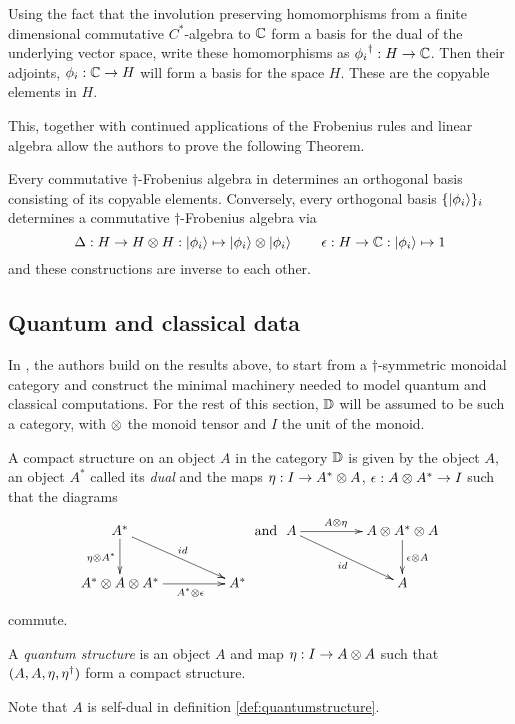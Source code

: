 Using the fact that the involution preserving homomorphisms from a finite dimensional commutative
$C^{*}$-algebra to $\mathbb{C}$ form a basis for the dual of the underlying vector space, write these
homomorphisms as ${\phi_{i}}^{\dagger}:H \to \mathbb{C}$. Then their adjoints, $\phi_{i}:\mathbb{C}\to H$ will form a
basis for the space $H$. These are the copyable elements in $H$.

This, together with continued applications of the Frobenius rules and linear algebra allow the
authors to prove the following Theorem.
\begin{theorem}
  Every commutative $\dagger$-Frobenius algebra in \fdh determines an orthogonal basis consisting
  of its copyable elements. Conversely, every orthogonal basis $\{\left\vert{\phi_{i}}\right\rangle\}_{i}$ determines
  a commutative $\dagger$-Frobenius algebra via \[\Delta:H\to H\otimes H: \left\vert{\phi_{i}}\right\rangle\mapsto
  \left\vert{\phi_{i}}\right\rangle \otimes \left\vert{\phi_{i}}\right\rangle\qquad\epsilon : H\to \mathbb{C} : \left\vert{\phi_{i}}\right\rangle \mapsto 1\] and these
  constructions are inverse to each other.
\end{theorem}

\subsection{Quantum and classical data}\label{sec:quantumclassical}
In \cite{coecke08structures}, the authors build on the results above,
to start from a $\dagger$-symmetric monoidal category and construct the minimal machinery needed to
model quantum and classical computations. For the rest of this section, $\mathbb{D}$ will be assumed to be
such a category, with $\otimes$ the monoid tensor and $I$ the unit of the monoid.

\begin{definition}\label{def:compact_structure}
  A compact structure on an object $A$ in the category $\mathbb{D}$ is given by the object $A$, an object
  $A^{*}$ called its \emph{dual} and the maps $\eta:I \to A^{*}\otimes A$, $\epsilon: A\otimes A^{*} \to I$
  such that the diagrams
  \[
    \xymatrix@C+20pt{
      A^{*} \ar[dr]^{id} \ar[d]_{\eta\*A^{*}} \\
      A^{*} \*A\*A^{*}  \ar[r]_(.6){A^{*} \*\epsilon} & A^{*}
    }
    \text{ and }
    \xymatrix@C+20pt{
      A \ar[r]^(.4){A\*\eta} \ar[dr]_{id} & A\* A^{*}\* A \ar[d]^{\epsilon\*A}\\
      & A
    }
  \]
  commute.
\end{definition}

\begin{definition}\label{def:quantumstructure}
  A \emph{quantum structure} is an object $A$ and map $\eta:I\to A\otimes A$ such that
  $(A,A,\eta,{\eta}^{\dagger})$ form a compact structure.
\end{definition}
Note that $A$ is self-dual in definition \ref{def:quantumstructure}.

